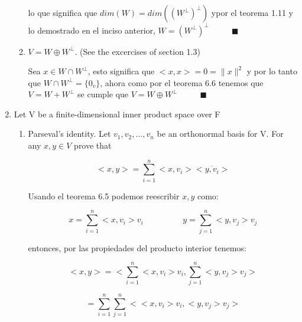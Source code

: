 \documentclass[12pt,a4paper]{article}
\providecommand{\norm}[1]{\lVert#1\rVert}
\begin{document}
\begin{enumerate}
\begin{enumerate}
        lo que significa que $dim(W) = dim((W^\perp)^\perp)$ ypor el teorema 1.11 y lo demostrado en el inciso anterior, $W = (W^\perp)^\perp$ $\hspace{1cm} \blacksquare$
        
        \item $V = W \oplus W^\perp$. (See the excercises of section 1.3)
        
        Sea $x \in W \cap W^\perp$, esto significa que $<x,x> = 0 = \norm{x}^2$ y por lo tanto que $W \cap W^\perp = \{0_v \}$, ahora como por el teorema 6.6 tenemos que $V = W + W^\perp$ se cumple que $V = W \oplus W^\perp $ $ \hspace{1cm} \blacksquare$
    \end{enumerate}
    
    
    
    
    
    
    
    \item Let V be a finite-dimensional inner product space over F
    \begin{enumerate}
        \item Parseval's identity. Let ${v_1,v_2,...,v_n}$ be an orthonormal basis for V. For any $x,y \in V$ prove that
        
        \begin{equation*}
            <x,y> =  \sum_{i=1}^{n}<x,v_i> \overline{<y,v_i>}
        \end{equation*}
        
        Usando el teorema 6.5 podemos reescribir $x,y$ como:
        
        \begin{equation*}
            x = \sum_{i=1}^{n} <x,v_i>v_i \hspace{2cm}  y = \sum_{j = 1}^{n} <y,v_j>v_j
        \end{equation*}
        
        entonces, por las propiedades del producto interior tenemos:
        
        \begin{equation*}
            <x,y> = <\sum_{i=1}^{n} <x,v_i>v_i, \sum_{j = 1}^{n} <y,v_j>v_j>
        \end{equation*}
        
        \begin{equation*}
             = \sum_{i = 1}^{n} \sum_{j = 1}^{n} <<x,v_i>v_i, <y,v_j>v_j>
        \end{equation*}
        

\end{enumerate}
\end{enumerate}
\end{document}
